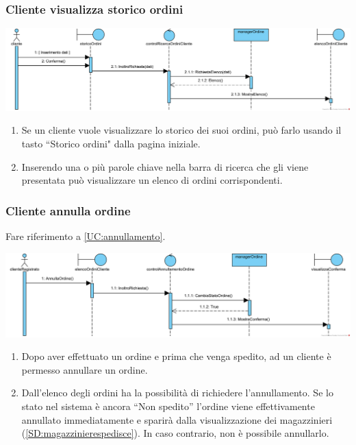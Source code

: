 \documentclass[12pt,a4paper]{article}
\begin{document}
\subsubsection{Cliente visualizza storico ordini}
\label{SD:storicoordini}
\begin{center}
\includegraphics[width=\textwidth]{SequenceDiagram/ClienteOrdiniRicerca}
\end{center}

\begin{enumerate}
\item Se un cliente vuole visualizzare lo storico dei suoi ordini, può farlo usando il tasto ``Storico ordini" dalla pagina iniziale.
\item Inserendo una o più parole chiave nella barra di ricerca che gli viene presentata può visualizzare un elenco di ordini corrispondenti.
\end{enumerate}

\newpage

\subsubsection{Cliente annulla ordine}
\label{SD:annull}

Fare riferimento a \ref{UC:annullamento}. \\

\begin{center}
\includegraphics[width=\textwidth]{SequenceDiagram/ClienteOrdineAnnulla}
\end{center}

\begin{enumerate}
\item Dopo aver effettuato un ordine e prima che venga spedito, ad un cliente è permesso annullare un ordine.
\item Dall'elenco degli ordini ha la possibilità di richiedere l'annullamento. Se lo stato nel sistema è ancora ``Non spedito'' l'ordine viene effettivamente annullato immediatamente e sparirà dalla visualizzazione dei magazzinieri (\ref{SD:magazzinierespedisce}). In caso contrario, non è possibile annullarlo.
\end{enumerate}
\end{document}
